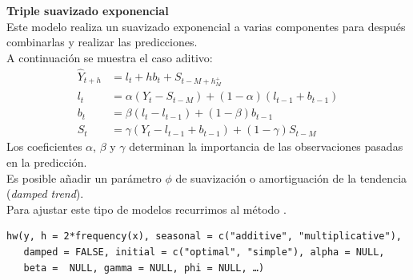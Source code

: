 \documentclass[10pt,a4paper,twoside]{beamer}
\begin{document}
\begin{frame}[fragile]
\textbf{Triple suavizado exponencial}\\
Este modelo realiza un suavizado exponencial a varias componentes para después combinarlas y realizar las predicciones.\\
A continuación se muestra el caso aditivo:
\begin{align*}
  \widehat{Y}_{t+h} &= l_t + h b_t + S_{t - M + h^+_M} \\
  l_t &= \alpha(Y_t - S_{t - M}) + (1 -\alpha)(l_{t-1}+ b_{t-1}) \\
  b_t &= \beta(l_t - l_{t-1}) + (1 -\beta) b_{t-1} \\
  S_t &= \gamma(Y_t - l_{t-1} + b_{t-1}) + (1 - \gamma) S_{t-M}
\end{align*}
Los coeficientes $\alpha$, $\beta$ y $\gamma$ determinan la importancia de las observaciones pasadas en la predicción.\\
Es posible añadir un parámetro $\phi$ de suavización o amortiguación de la tendencia (\textit{damped trend}).\\
Para ajustar este tipo de modelos recurrimos al método .\\

\vspace{.4cm}

\begin{Verbatim}[fontsize=\footnotesize]
hw(y, h = 2*frequency(x), seasonal = c("additive", "multiplicative"),
   damped = FALSE, initial = c("optimal", "simple"), alpha = NULL,
   beta =  NULL, gamma = NULL, phi = NULL, …)
\end{Verbatim}

\end{frame}

\end{document}
